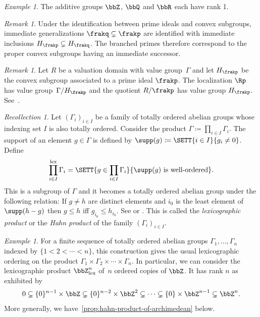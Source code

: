 \documentclass{amsart}
\numberwithin{equation}{section}%
\theoremstyle{remark}
\newtheorem{Exa}[equation]{Example}
\newtheorem{Rem}[equation]{Remark}
\newtheorem{Rec}[equation]{Recollection}
\begin{document}
\begin{Exa}
	The additive groups $\bbZ$, $\bbQ$ and $\bbR$ each have rank 1.
\end{Exa}

\begin{Rem}\label{rem:convex-branched}
	Under the identification between prime ideals and convex subgroups, immediate generalizations $\frakq \subsetneq \frakp$ are identified with immediate inclusions $H_\frakp \subsetneq H_\frakq$. The branched primes therefore correspond to the proper convex subgroups having an immediate successor.
\end{Rem}

\begin{Rem}\label{rem:change-of-group}
	Let $R$ be a valuation domain with value group~$\Gamma$ and let $H_\frakp$ be the convex subgroup associated to a prime ideal $\frakp$. The localization $\Rp$ has value group~$\Gamma/H_\frakp$ and the quotient $R/\frakp$ has value group $H_\frakp$. See~\cite[Lemma~II.3.7]{FuchsSalce01}.
\end{Rem}

\begin{Rec}
	Let $(\Gamma_i)_{i \in I}$ be a family of totally ordered abelian groups whose indexing set $I$ is also totally ordered. Consider the product $\Gamma \coloneqq \prod_{i \in I} \Gamma_i$. The support of an element $g \in \Gamma$ is defined by $\supp(g) \coloneqq \SETT{i \in I}{g_i \neq 0}$. Define 
	\[
		\prod_{i \in I}^{\mathrm{lex}} \Gamma_i = \SETT{ g \in \prod_{i\in I} \Gamma_i}{\supp(g) \text{ is well-ordered}}.
	\]
	This is a subgroup of $\Gamma$ and it becomes a totally ordered abelian group under the following relation: If $g \neq h$ are distinct elements and $i_0$ is the least element of $\supp(h-g)$ then $g \le h$ iff $g_{i_0} \le h_{i_0}$. See \cite[Page~62]{FuchsSalce01} or \cite[Page~167]{Gilmer92}. This is called the \emph{lexicographic product} or the \emph{Hahn product} of the family $(\Gamma_i)_{i \in I}$.
\end{Rec}

\begin{Exa}
	For a finite sequence of totally ordered abelian groups $\Gamma_1,\ldots,\Gamma_n$ indexed by $\{1<2<\cdots<n\}$, this construction gives the usual lexicographic ordering on the product $\Gamma_1 \times \Gamma_2 \times \cdots \times \Gamma_n$. In particular, we can consider the lexicographic product $\bbZ^n_{\mathrm{lex}}$ of~$n$ ordered copies of $\bbZ$. It has rank $n$ as exhibited by
	\[
		0 \subsetneq \{ 0 \}^{n-1} \times \bbZ \subsetneq \{0\}^{n-2} \times \bbZ^2 \subsetneq \cdots \subsetneq \{0\} \times \bbZ^{n-1} \subsetneq \bbZ^n.
	\]
	More generally, we have~\cref{prop:hahn-product-of-archimedean} below.
\end{Exa}
\end{document}

